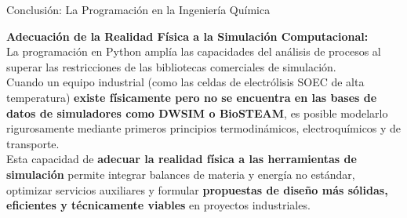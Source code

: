 \documentclass[12pt]{article}
\begin{document}
\begin{minipage}[t]{0.49\linewidth}
    \begin{posterbox}{Conclusión: La Programación en la Ingeniería Química}
        \fontsize{15}{19.5}\selectfont
        \begin{tcolorbox}[
            enhanced,
            colback=primaryblue,
            colframe=pyyellow,
            boxrule=3pt,
            arc=6pt,
            top=48pt,
            bottom=48pt,
            left=22pt,
            right=22pt
        ]
            \color{white}
            {\color{pyyellow}\fontsize{25}{30}\selectfont\bfseries Adecuación de la Realidad Física a la Simulación Computacional:}\\[16pt]
            {\fontsize{19}{27.5}\selectfont
            La programación en Python amplía las capacidades del análisis de procesos al superar las restricciones de las bibliotecas comerciales de simulación.\\[14pt]
            Cuando un equipo industrial (como las celdas de electrólisis SOEC de alta temperatura) \textbf{existe físicamente pero no se encuentra en las bases de datos de simuladores como DWSIM o BioSTEAM}, es posible modelarlo rigurosamente mediante primeros principios termodinámicos, electroquímicos y de transporte.\\[14pt]
            Esta capacidad de \textbf{adecuar la realidad física a las herramientas de simulación} permite integrar balances de materia y energía no estándar, optimizar servicios auxiliares y formular \textbf{propuestas de diseño más sólidas, eficientes y técnicamente viables} en proyectos industriales.}
        \end{tcolorbox}
    \end{posterbox}

\end{minipage}%
\hfill
\end{document}
